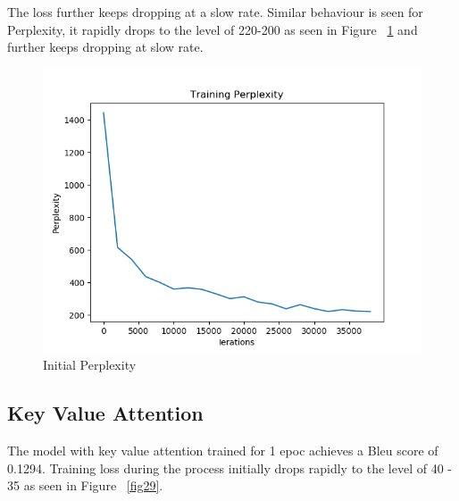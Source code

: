 \documentclass[11pt,a4paper]{article}
\begin{document}
The loss further keeps dropping at a slow rate. Similar behaviour is seen for Perplexity, it rapidly drops to the level of 220-200 as seen in Figure ~\ref{fig27} and further keeps dropping at slow rate.


\begin{figure}[!htbp]
\includegraphics[width=\linewidth]{de_add_ppl_1.png}
\caption{Initial Perplexity}
\label{fig27}
\end{figure}


\pagebreak
\subsection{Key Value Attention}

The model with key value attention trained for 1 epoc achieves a Bleu score of 0.1294.
Training loss during the process initially drops rapidly to the level of 40 - 35 as seen in Figure ~\ref{fig29}. 
\end{document}
